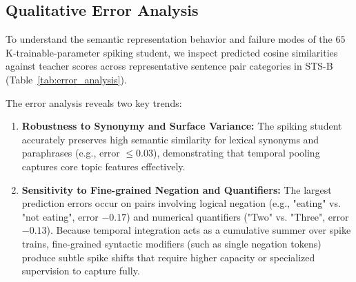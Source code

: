 \documentclass[10pt,journal,compsoc]{IEEEtran}
\begin{document}
\subsection{Qualitative Error Analysis}
To understand the semantic representation behavior and failure modes of the $65$K-trainable-parameter spiking student, we inspect predicted cosine similarities against teacher scores across representative sentence pair categories in STS-B (Table~\ref{tab:error_analysis}).

\begin{table}[t!]
\caption{Qualitative error analysis on representative STS-B sentence pairs. Comparison of frozen teacher scores (\texttt{all-MiniLM-L6-v2}) and Delta BPTT student predictions.}
\label{tab:error_analysis}
\begin{center}
\end{center}
\end{table}

The error analysis reveals two key trends:
\begin{enumerate}
    \item \textbf{Robustness to Synonymy and Surface Variance:} The spiking student accurately preserves high semantic similarity for lexical synonyms and paraphrases (e.g., error $\le 0.03$), demonstrating that temporal pooling captures core topic features effectively.
    \item \textbf{Sensitivity to Fine-grained Negation and Quantifiers:} The largest prediction errors occur on pairs involving logical negation (e.g., "eating" vs. "not eating", error $-0.17$) and numerical quantifiers ("Two" vs. "Three", error $-0.13$). Because temporal integration acts as a cumulative summer over spike trains, fine-grained syntactic modifiers (such as single negation tokens) produce subtle spike shifts that require higher capacity or specialized supervision to capture fully.
\end{enumerate}
\end{document}
